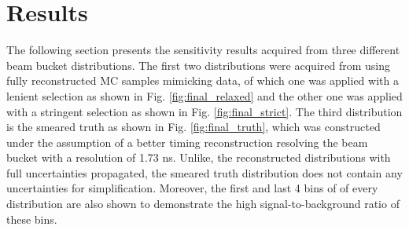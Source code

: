 \section{Results}
\label{sec:result}

The following section presents the sensitivity results acquired from three different beam bucket distributions.
The first two distributions were acquired from using fully reconstructed MC samples mimicking data, of which one was applied with a lenient selection as shown in Fig. \ref{fig:final_relaxed} and the other one was applied with a stringent selection as shown in Fig. \ref{fig:final_strict}.
The third distribution is the smeared truth as shown in Fig. \ref{fig:final_truth}, which was constructed under the assumption of a better timing reconstruction resolving the beam bucket with a resolution of 1.73 ns.
Unlike, the reconstructed distributions with full uncertainties propagated, the smeared truth distribution does not contain any uncertainties for simplification. 
Moreover, the first and last 4 bins of of every distribution are also shown to demonstrate the high signal-to-background ratio of these bins.

